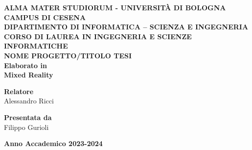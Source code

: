 \begin{titlepage}
    \begin{center}
        \vspace*{1cm}
        \textbf{ALMA MATER STUDIORUM - UNIVERSITÀ DI BOLOGNA}\\
        \textbf{CAMPUS DI CESENA}\\
        \vspace{0.5cm}
        \textbf{DIPARTIMENTO DI INFORMATICA – SCIENZA E INGEGNERIA}\\
        \vspace{0.5cm}
        \textbf{CORSO DI LAUREA IN INGEGNERIA E SCIENZE INFORMATICHE}\\
        \vspace{2cm}
        \textbf{\huge NOME PROGETTO/TITOLO TESI}\\
        \vspace{1cm}
        \textbf{Elaborato in}\\
        \textbf{Mixed Reality}\\
        \vspace{3cm}
        \begin{minipage}[t]{0.45\textwidth}
            \textbf{Relatore}\\
            Alessandro Ricci
        \end{minipage}
        \hfill
        \begin{minipage}[t]{0.45\textwidth}
            \raggedleft
            \textbf{Presentata da}\\
            Filippo Gurioli
        \end{minipage}
        \vfill
        \vspace{0.8cm}
        \textbf{Anno Accademico 2023-2024}
    \end{center}
\end{titlepage}